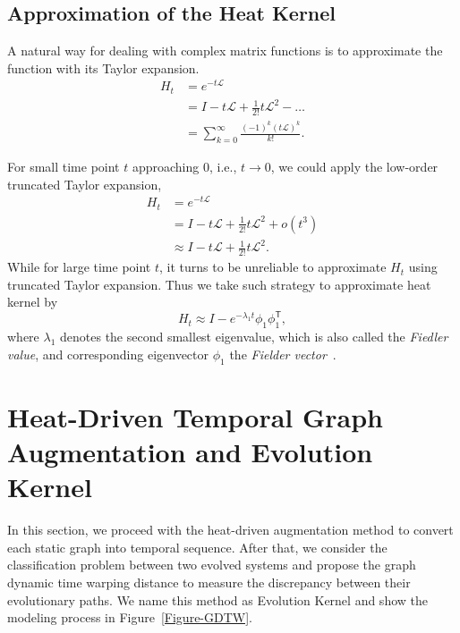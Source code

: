 \documentclass[10pt,journal,compsoc]{IEEEtran}
\begin{document}
\subsection{Approximation of the Heat Kernel}
A natural way for dealing with complex matrix functions is to approximate the function with its Taylor expansion.
\begin{equation}
\begin{aligned}
     H_{t} & = e^{-t \mathcal{L}} \\
            & = I - t\mathcal{L} + \frac{1}{2!}{t\mathcal{L}}^2 - \ldots \\
            & = \sum\limits_{k = 0}^{\infty}\frac{(-1)^{k}(t \mathcal{L})^k}{k!}.
\end{aligned}
\end{equation}


For small time point $t$ approaching 0, i.e., $t \rightarrow 0$, we could apply the low-order truncated Taylor expansion,
\begin{equation}
\begin{aligned}
     H_{t} & = e^{-t \mathcal{L}} \\
            & = I - t\mathcal{L} + \frac{1}{2!}{t\mathcal{L}}^2 + o(t^{3})\\
            & \approx I - t\mathcal{L} + \frac{1}{2!}{t\mathcal{L}}^2.
\end{aligned}
\end{equation}
While for large time point $t$, it turns to be unreliable to approximate $H_{t}$ using truncated Taylor expansion. Thus we take such strategy to approximate heat kernel by
\begin{equation}
     H_{t} \approx I - e^{-\lambda_{1}t}\phi_{1}\phi_{1}^{\mathsf{T}},
\end{equation}
where $\lambda_{1}$ denotes the second smallest eigenvalue, which is also called the \emph{Fiedler value}, and corresponding eigenvector $\phi_{1}$ the \emph{Fielder vector}~\cite{fiedler-value, just-slaq}.


\section{Heat-Driven Temporal Graph Augmentation and Evolution Kernel}\label{Section-Evolution-Kernel}
In this section, we proceed with the heat-driven augmentation method to convert each static graph into temporal sequence. After that, we consider the classification problem between two evolved systems and propose the graph dynamic time warping distance to measure the discrepancy between their evolutionary paths. We name this method as Evolution Kernel and show the modeling process in Figure~\ref{Figure-GDTW}.
\end{document}
